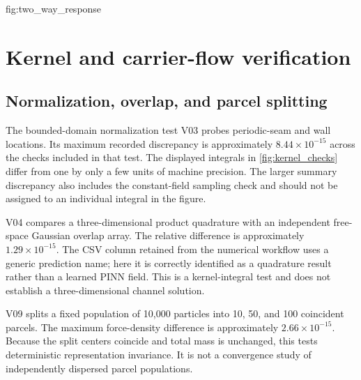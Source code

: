 {fig:two_way_response}

\section{Kernel and carrier-flow verification}
\subsection{Normalization, overlap, and parcel splitting}
The bounded-domain normalization test V03 probes periodic-seam and wall
locations. Its maximum recorded discrepancy is approximately
$8.44\times10^{-15}$ across the checks included in that test. The displayed
integrals in \cref{fig:kernel_checks} differ from one by only a few units
of machine precision. The larger summary discrepancy also includes the
constant-field sampling check and should not be assigned to an individual
integral in the figure.

V04 compares a three-dimensional product quadrature with an independent
free-space Gaussian overlap array. The relative difference is approximately
$1.29\times10^{-15}$. The CSV column retained from the numerical workflow
uses a generic prediction name; here it is correctly identified as a
quadrature result rather than a learned PINN field. This is a kernel-integral
test and does not establish a three-dimensional channel solution.

V09 splits a fixed population of 10,000 particles into 10, 50, and 100
coincident parcels. The maximum force-density difference is approximately
$2.66\times10^{-15}$. Because the split centers coincide and total mass
is unchanged, this tests deterministic representation invariance. It is not
a convergence study of independently dispersed parcel populations.


